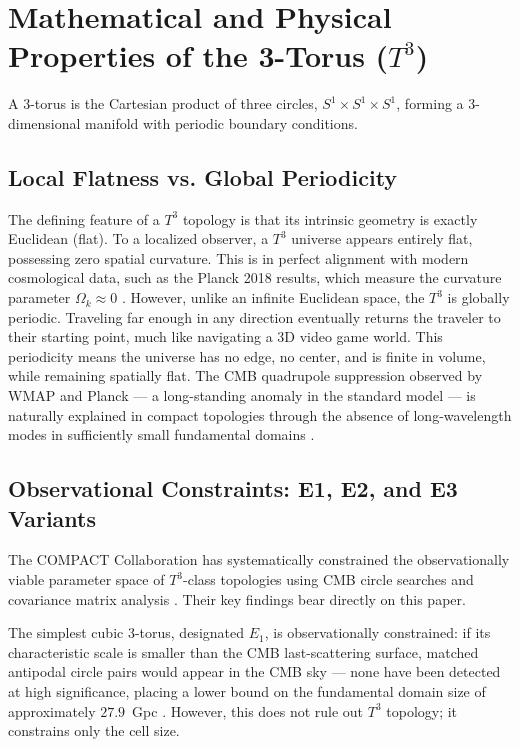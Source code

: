 \documentclass[aps,prd,11pt,onecolumn,superscriptaddress,nofootinbib,floatfix]{revtex4-2}
\begin{document}
\section{Mathematical and Physical Properties of the 3-Torus ($T^3$)}
\label{sec:t3-properties}

A 3-torus is the Cartesian product of three circles, $S^1 \times S^1 \times S^1$, forming a 3-dimensional manifold with periodic boundary conditions.

\subsection{Local Flatness vs. Global Periodicity}
The defining feature of a $T^3$ topology is that its intrinsic geometry is exactly Euclidean (flat). To a localized observer, a $T^3$ universe appears entirely flat, possessing zero spatial curvature. This is in perfect alignment with modern cosmological data, such as the Planck 2018 results, which measure the curvature parameter $\Omega_k \approx 0$ \cite{planck_2018}. However, unlike an infinite Euclidean space, the $T^3$ is globally periodic. Traveling far enough in any direction eventually returns the traveler to their starting point, much like navigating a 3D video game world. This periodicity means the universe has no edge, no center, and is finite in volume, while remaining spatially flat. The CMB quadrupole suppression observed by WMAP and Planck --- a long-standing anomaly in the standard model --- is naturally explained in compact topologies through the absence of long-wavelength modes in sufficiently small fundamental domains \cite{compact_eigenmodes}.

\subsection{Observational Constraints: E1, E2, and E3 Variants}

The COMPACT Collaboration has systematically constrained the observationally viable parameter space of $T^3$-class topologies using CMB circle searches and covariance matrix analysis \cite{compact_pt1, compact_eigenmodes}. Their key findings bear directly on this paper.

The simplest cubic 3-torus, designated $E_1$, is observationally constrained: if its characteristic scale is smaller than the CMB last-scattering surface, matched antipodal circle pairs would appear in the CMB sky --- none have been detected at high significance, placing a lower bound on the fundamental domain size of approximately $27.9$~Gpc \cite{compact_pt1}. However, this does not rule out $T^3$ topology; it constrains only the cell size.
\end{document}

